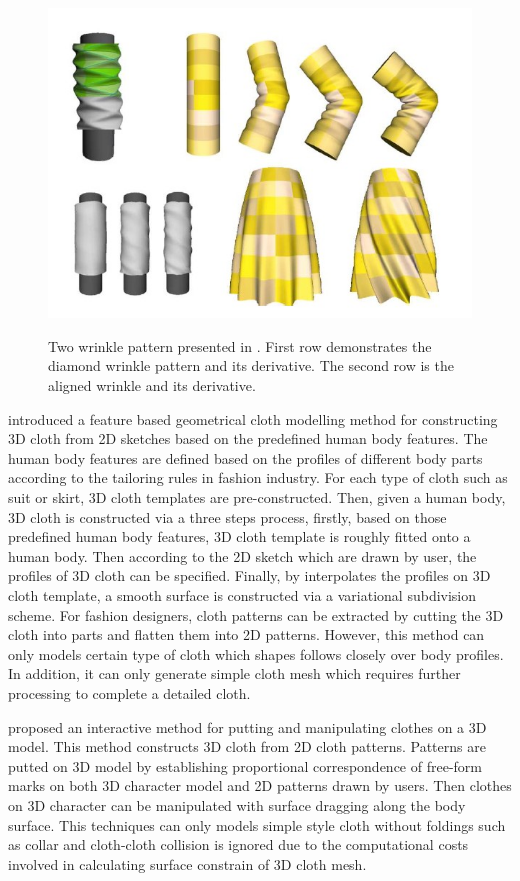 \begin{figure}[ht]
    \centering
	\includegraphics[width=0.7\columnwidth]{../images/decaudin}\\[1cm]
    \caption[Wrinkle patterns in ]{Two wrinkle pattern presented in . First row demonstrates the  diamond wrinkle pattern and its derivative. The second row is the aligned wrinkle and its derivative.}
    \label{figure:decaudin}
\end{figure}

 introduced a feature based geometrical cloth modelling method for constructing 3D cloth from 2D sketches based on the predefined human body features. The human body features are defined based on the profiles of different body parts according to the tailoring rules in fashion industry. For each type of cloth such as suit or skirt, 3D cloth templates are pre-constructed. Then, given a human body, 3D cloth is constructed via a three steps process, firstly, based on those predefined human body features, 3D cloth template is roughly fitted onto a human body. Then according to the 2D sketch which are drawn by user, the profiles of 3D cloth can be specified. Finally, by interpolates the profiles on 3D cloth template, a smooth surface is constructed via a variational subdivision scheme. For fashion designers, cloth patterns can be extracted by cutting the 3D cloth into parts and flatten them into 2D patterns. However, this method can only models certain type of cloth which shapes follows closely over body profiles. In addition, it can only generate simple cloth mesh which requires further processing to complete a detailed cloth.

 proposed an interactive method for putting and manipulating clothes on a 3D model. This method constructs 3D cloth from 2D cloth patterns. Patterns are putted on 3D model by establishing proportional correspondence of free-form marks on both 3D character model and 2D patterns drawn by users. Then clothes on 3D character can be manipulated with surface dragging along the body surface. This techniques can only models simple style cloth without foldings such as collar and cloth-cloth collision is ignored due to the computational costs involved in calculating surface constrain of 3D cloth mesh.


